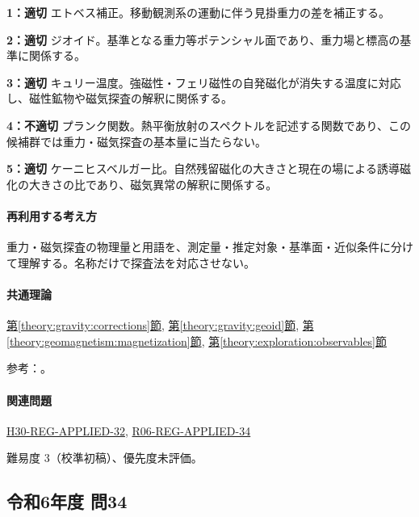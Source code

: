 \noindent\textbf{1：適切} エトベス補正。移動観測系の運動に伴う見掛重力の差を補正する。\par

\noindent\textbf{2：適切} ジオイド。基準となる重力等ポテンシャル面であり、重力場と標高の基準に関係する。\par

\noindent\textbf{3：適切} キュリー温度。強磁性・フェリ磁性の自発磁化が消失する温度に対応し、磁性鉱物や磁気探査の解釈に関係する。\par

\noindent\textbf{4：不適切} プランク関数。熱平衡放射のスペクトルを記述する関数であり、この候補群では重力・磁気探査の基本量に当たらない。\par

\noindent\textbf{5：適切} ケーニヒスベルガー比。自然残留磁化の大きさと現在の場による誘導磁化の大きさの比であり、磁気異常の解釈に関係する。\par

\paragraph{再利用する考え方} 重力・磁気探査の物理量と用語を、測定量・推定対象・基準面・近似条件に分けて理解する。名称だけで探査法を対応させない。

\paragraph{共通理論} \hyperref[theory:gravity:corrections]{第\ref*{theory:gravity:corrections}節}, \hyperref[theory:gravity:geoid]{第\ref*{theory:gravity:geoid}節}, \hyperref[theory:geomagnetism:magnetization]{第\ref*{theory:geomagnetism:magnetization}節}, \hyperref[theory:exploration:observables]{第\ref*{theory:exploration:observables}節}

\par 参考：\cite{gsi_gravity_definitions,kanaya_okuma2011}。

\paragraph{関連問題} \hyperref[q:h30-reg-applied-32]{H30-REG-APPLIED-32}, \hyperref[q:r06-reg-applied-34]{R06-REG-APPLIED-34}

\par 難易度 3（校準初稿）、優先度未評価。

\subsection{令和6年度 問34}
\label{q:r06-reg-applied-34}

